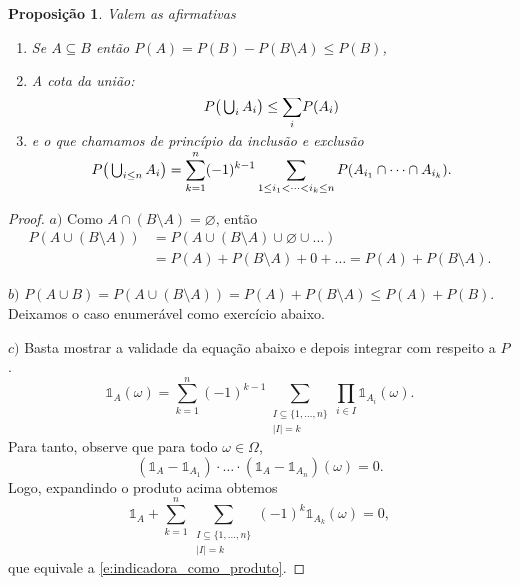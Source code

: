 \documentclass[reqno, final]{book}
\newcommand*\1{\mathds{1}}
\newtheorem{proposition}[theorem]{Proposição}
\DeclareMathOperator*{\mcup}{{\textstyle \bigcup}}
\begin{document}
\begin{proposition}
  Valem as afirmativas
  \begin{enumerate}[\quad a)]
  \item Se $A \subseteq B$ então $P(A) = P(B) - P(B \setminus A) \leq P(B)$,
  \item A cota da união:
    \begin{equation}
      P\big(\mcup\nolimits_i A_i\big) \leq \smash{\sum\limits_i} P(A_i)
    \end{equation}
  \item e o que chamamos de princípio da \emph{inclusão e exclusão} 
    \begin{equation}
      P\big(\mcup\nolimits_{i \leq n} A_i\big) = \smash{\sum\limits_{k = 1}^n} (-1)^{k-1} \sum\limits_{1 \leq i_1 < \dots < i_k \leq n} P(A_{i_1} \cap \dots \cap A_{i_k}).
    \end{equation}
  \end{enumerate}
\end{proposition}

\begin{proof}
  $a)$ Como $A \cap (B \setminus A) = \varnothing$, então
    \begin{equation}
      \begin{split}
        P(A \cup (B \setminus A)) & = P(A \cup (B \setminus A) \cup \varnothing \cup \dots)\\
        & = P(A) + P(B \setminus A) + 0 + \dots = P(A) + P(B \setminus
        A).
      \end{split}
    \end{equation}

  $b)$ $P(A \cup B) = P (A \cup (B \setminus A)) = P(A) + P(B \setminus
    A) \leq P(A) + P(B)$.
    Deixamos o caso enumerável como exercício abaixo.

  $c)$ Basta mostrar a validade da equação abaixo e depois integrar com
    respeito a $P$.
    \begin{equation}
      \label{e:indicadora_como_produto}
      \1_A(\omega) = \sum_{k=1}^n (-1)^{k - 1} \sum_{\substack{I \subseteq \{1, \dots, n\}\\|I| = k}} \prod_{i \in I} \1_{A_i}(\omega).
    \end{equation}
    Para tanto, observe que para todo $\omega \in \Omega$,
    \begin{equation}
      (\1_A - \1_{A_1}) \cdot \dots \cdot (\1_A - \1_{A_n})(\omega) = 0.
    \end{equation}
    Logo, expandindo o produto acima obtemos
    \begin{equation}
      \1_A + \sum_{k = 1}^n \sum_{\substack{I \subseteq \{1, \dots, n\}\\|I| = k}} (-1)^k \1_{A_k}(\omega) = 0,
    \end{equation}
    que equivale a \eqref{e:indicadora_como_produto}.
\end{proof}
\end{document}
